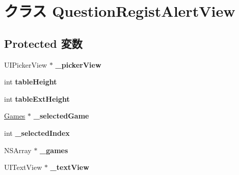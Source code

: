 \hypertarget{interface_question_regist_alert_view}{
\section{クラス QuestionRegistAlertView}
\label{interface_question_regist_alert_view}
}
\subsection*{Protected 変数}
\begin{DoxyCompactItemize}
\item 
\hypertarget{interface_question_regist_alert_view_a70d303c0b1da0195d28990596f39d53b}{
UIPickerView $\ast$ {\bfseries \_\-pickerView}}
\label{interface_question_regist_alert_view_a70d303c0b1da0195d28990596f39d53b}

\item 
\hypertarget{interface_question_regist_alert_view_a14a501764731bb6a9c33949e59b1924b}{
int {\bfseries tableHeight}}
\label{interface_question_regist_alert_view_a14a501764731bb6a9c33949e59b1924b}

\item 
\hypertarget{interface_question_regist_alert_view_a6e87325e5bc16bd42242d130951e0790}{
int {\bfseries tableExtHeight}}
\label{interface_question_regist_alert_view_a6e87325e5bc16bd42242d130951e0790}

\item 
\hypertarget{interface_question_regist_alert_view_a9e614e1fb9be6c6be47b1be0ec035fe0}{
\hyperlink{interface_games}{Games} $\ast$ {\bfseries \_\-selectedGame}}
\label{interface_question_regist_alert_view_a9e614e1fb9be6c6be47b1be0ec035fe0}

\item 
\hypertarget{interface_question_regist_alert_view_a15a97997c4826ef25dc2bc983ef4e563}{
int {\bfseries \_\-selectedIndex}}
\label{interface_question_regist_alert_view_a15a97997c4826ef25dc2bc983ef4e563}

\item 
\hypertarget{interface_question_regist_alert_view_a8b3d707ff7d7afb245a12b0db0b4e54b}{
NSArray $\ast$ {\bfseries \_\-games}}
\label{interface_question_regist_alert_view_a8b3d707ff7d7afb245a12b0db0b4e54b}

\item 
\hypertarget{interface_question_regist_alert_view_aecdca0c9bbbb17e02735dec61954c5c4}{
UITextView $\ast$ {\bfseries \_\-textView}}
\label{interface_question_regist_alert_view_aecdca0c9bbbb17e02735dec61954c5c4}

\end{DoxyCompactItemize}

